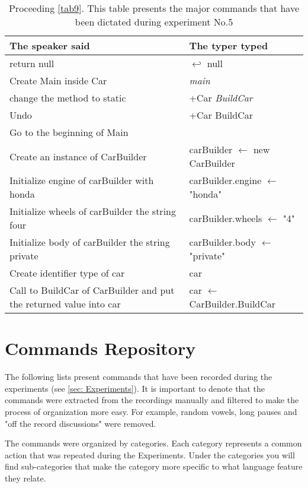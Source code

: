 \begin{table}[H]
	\begin{tabular}{|p{10cm}|p{6cm}|}
		\hline
		\rowcolor[HTML]{9B9B9B} 
		{\color[HTML]{000000} The speaker said} & {\color[HTML]{000000} The typer typed} \\ \hline
		return null & $\hookleftarrow$ null \\ \hline
		Create Main inside Car & \textit{main} \\ \hline
		change the method to static & +Car \textit{BuildCar} \\ \hline
		Undo & +Car BuildCar \\ \hline
		Go to the beginning of Main & \\ \hline
		Create an instance of CarBuilder & carBuilder $\leftarrow$ new CarBuilder \\ \hline
		Initialize engine of carBuilder with honda & carBuilder.engine $\leftarrow$ "honda" \\ \hline
		Initialize wheels of carBuilder the string four & carBuilder.wheels $\leftarrow$ "4" \\ \hline
		Initialize body of carBuilder the string private & carBuilder.body $\leftarrow$ "private" \\ \hline
		Create identifier type of car & car \\ \hline
		Call to BuildCar of CarBuilder and put the returned value into car & car $\leftarrow$ CarBuilder.BuildCar \\ \hline
	\end{tabular}
	\caption{Proceeding \autoref{tab9}. This table presents the major commands that have been dictated during experiment No.5}
	\label{tab10}
\end{table}
\section{Commands Repository} \label{sec: Commands Repositorysi}
The following lists present commands that have been recorded during the experiments (see \ref{sec: Experiments}). It is important to denote that the commands were extracted from the recordings manually and filtered to make the process of organization more easy. For example, random vowels, long pauses and "off the record discussions" were removed. 

The commands were organized by categories. Each category represents a common action that was repeated during the Experiments. Under the categories you will find sub-categories that make the category more specific to what language feature they relate. 

